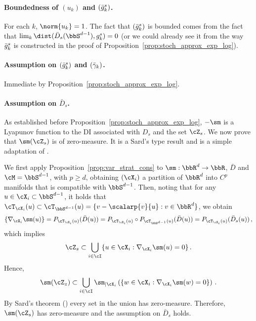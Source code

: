 \paragraph{Boundedness of $(u_k)$ and $(\bar{g}_k^s)$.} For each $k$, $\norm{u_k} = 1$. The fact that $(\bar{g}_k^s)$ is bounded comes from the fact that $\lim_{k}\dist(\bar{D}_s(\bbS^{d-1}), g_k^s) = 0$ (or we could already see it from the way $\bar{g}_k^s$ is constructed in the proof of Proposition~\ref{prop:stoch_approx_exp_log}).
\paragraph{Assumption on $(\bar{g}_k^s)$ and $(\bar{\gamma}_k)$.} Immediate by Proposition~\ref{prop:stoch_approx_exp_log}.

\paragraph{Assumption on $\bar{D}_s$.} As established before Proposition~\ref{prop:stoch_approx_exp_log}, $-\sm$ is a Lyapunov function to the DI associated with $D_s$ and the set $\cZ_s$. We now prove that $\sm(\cZ_s)$ is of zero-measure. It is a Sard's type result and is a simple adaptation of {\cite[Theorem 5.]{bolte2021conservative}}.
  

  We first apply Proposition~\ref{prop:var_strat_cons} to $\sm: \bbR^d \rightarrow \bbR$, $\bar{D}$ and $\cM = \bbS^{d-1}$, with $p \geq d$, obtaining $(\cX_i)$ a partition of $\bbR^d$ into $C^p$ manifolds that is compatible with $\bbS^{d-1}$. Then, noting that for any $u \in \cX_i \subset \bbS^{d-1}$, it holds that $\cT_{\cX_i}(u) \subset \cT_{\bbS^{d-1}}(u) = \{v - \scalarp{v}{u} : v \in \bbR^d \}$, we obtain
  \begin{equation*}
   \{ \nabla_{\cX_i} \sm(u)\} = P_{\cT_{\cX_i}(u)}(\bar{D}(u)) =P_{\cT_{\cX_i}(u)}\circ P_{\cT_{\bbS^{d-1}}(u)}(\bar{D}(u)) = P_{\cT_{\cX_i}(u)}(\bar{D}_s(u))\, ,
  \end{equation*}
   which implies
   \begin{equation*}
     \cZ_s \subset \bigcup_{i \in \cI} \{ u \in \cX_i: \nabla_{\cX_i} \sm(u) = 0\}\, .
   \end{equation*}
   Hence,
   \begin{equation*}
     \sm(\cZ_z) \subset \bigcup_{i \in \cI} \sm_{|\cX_i}\left(\{ w \in \cX_i: \nabla_{\cX_i} \sm(w) = 0\}\right)\, .
   \end{equation*}
   By Sard's theorem (\cite{sard1942measure}) every set in the union has zero-measure. Therefore, $\sm(\cZ_s)$ has zero-measure and the assumption on $\bar{D}_s$ holds.

